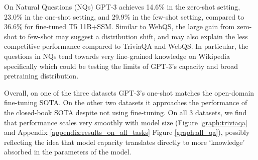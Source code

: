 On Natural Questions (NQs) GPT-3 achieves 14.6\% in the zero-shot setting, 23.0\% in the one-shot setting, and 29.9\% in the few-shot setting, compared to 36.6\% for fine-tuned T5 11B+SSM.  Similar to WebQS, the large gain from zero-shot to few-shot may suggest a distribution shift, and may also explain the less competitive performance compared to TriviaQA and WebQS.  In particular, the questions in NQs tend towards very fine-grained knowledge on Wikipedia specifically which could be testing the limits of GPT-3's capacity and broad pretraining distribution.

Overall, on one of the three datasets GPT-3's one-shot matches the open-domain fine-tuning SOTA. On the other two datasets it approaches the performance of the closed-book SOTA despite not using fine-tuning.  On all 3 datasets, we find that performance scales very smoothly with model size (Figure \ref{graph:triviaqa} and Appendix \ref{appendix:results_on_all_tasks} Figure \ref{graph:all_qa}), possibly reflecting the idea that model capacity translates directly to more ‘knowledge’ absorbed in the parameters of the model.



